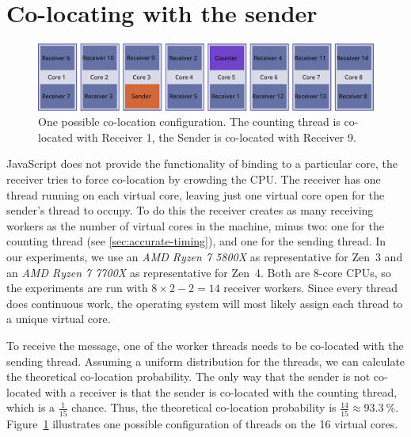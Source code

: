 \documentclass[11pt,
  titlepage=false,
  parskip=half,      %
]{scrreprt}
\begin{document}
\section{Co-locating with the sender}
\label{sec:co-location}

\begin{figure}
\centering
\includegraphics[width=\textwidth]{figures/colocation}

\caption{One possible co-location configuration. The counting thread is co-located with Receiver 1, the Sender is co-located with Receiver 9.}
\label{fig:colocation}

\end{figure}

JavaScript does not provide the functionality of binding to a particular core,
the receiver tries to force co-location by crowding the CPU.
The receiver has one thread running on each virtual core,
leaving just one virtual core open for the sender's thread to occupy.
To do this the receiver creates as many receiving workers as the number of virtual cores in the machine, minus two:
one for the counting thread (see \ref{sec:accurate-timing}), and one for the sending thread.
In our experiments, we use an \textit{AMD Ryzen 7 5800X} as representative for Zen~3 and an \textit{AMD Ryzen 7 7700X} as representative for Zen~4.
Both are 8-core CPUs, so the experiments are run with $8 \times 2 - 2 = 14$ receiver workers.
Since every thread does continuous work, the operating system will most likely assign each thread to a unique virtual core.

To receive the message, one of the worker threads needs to be co-located with the sending thread.
Assuming a uniform distribution for the threads, we can calculate the theoretical co-location probability.
The only way that the sender is not co-located with a receiver is that the sender is co-located with the counting thread,
which is a $\frac{1}{15}$ chance.
Thus, the theoretical co-location probability is $\frac{14}{15} \approx 93.3~\%$.
Figure~\ref{fig:colocation} illustrates one possible configuration of threads on the 16 virtual cores.
\end{document}
